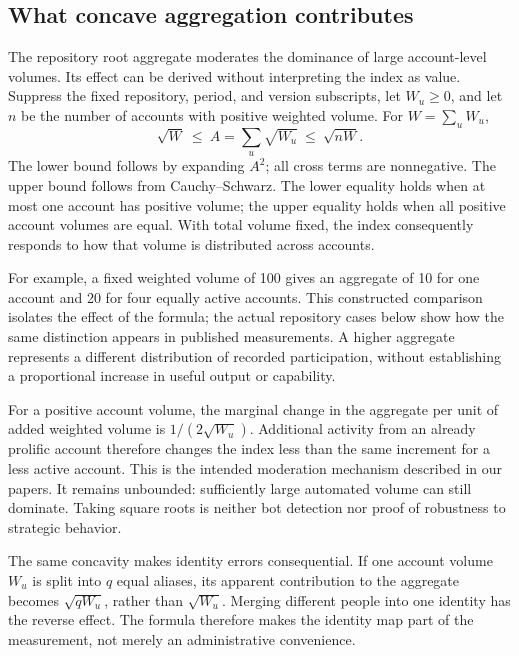 \subsection{What concave aggregation contributes}
The repository root aggregate moderates the dominance of large account-level volumes. Its effect can be derived without interpreting the index as value. Suppress the fixed repository, period, and version subscripts, let \(W_u\geq0\), and let \(n\) be the number of accounts with positive weighted volume. For \(W=\sum_u W_u\),
\begin{equation}
\sqrt{W}\ \leq\ A=\sum_u\sqrt{W_u}\ \leq\ \sqrt{nW}.
\label{eq:ch4-bounds}
\end{equation}
The lower bound follows by expanding \(A^2\); all cross terms are nonnegative. The upper bound follows from Cauchy--Schwarz. The lower equality holds when at most one account has positive volume; the upper equality holds when all positive account volumes are equal. With total volume fixed, the index consequently responds to how that volume is distributed across accounts.

For example, a fixed weighted volume of 100 gives an aggregate of 10 for one account and 20 for four equally active accounts. This constructed comparison isolates the effect of the formula; the actual repository cases below show how the same distinction appears in published measurements. A higher aggregate represents a different distribution of recorded participation, without establishing a proportional increase in useful output or capability.

For a positive account volume, the marginal change in the aggregate per unit of added weighted volume is \(1/(2\sqrt{W_u})\). Additional activity from an already prolific account therefore changes the index less than the same increment for a less active account. This is the intended moderation mechanism described in our papers. It remains unbounded: sufficiently large automated volume can still dominate. Taking square roots is neither bot detection nor proof of robustness to strategic behavior.

The same concavity makes identity errors consequential. If one account volume \(W_u\) is split into \(q\) equal aliases, its apparent contribution to the aggregate becomes \(\sqrt{qW_u}\), rather than \(\sqrt{W_u}\). Merging different people into one identity has the reverse effect. The formula therefore makes the identity map part of the measurement, not merely an administrative convenience.

